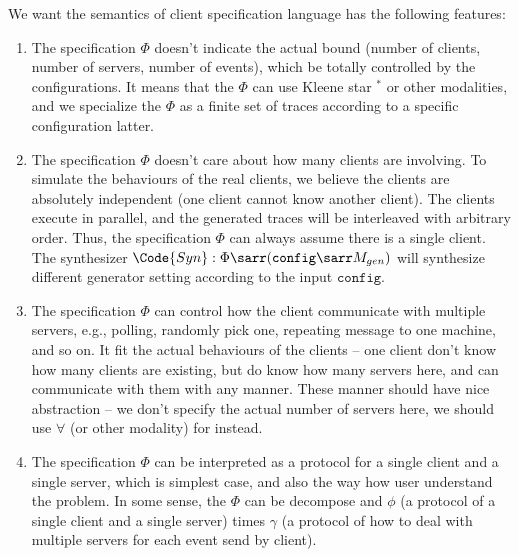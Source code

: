 We want the semantics of client specification language has the following features:
\begin{enumerate}
    \item The specification $\Phi$ doesn't indicate the actual bound (number of clients, number of servers, number of events), which be totally controlled by the configurations. It means that the $\Phi$ can use Kleene star $^*$ or other modalities, and we specialize the $\Phi$ as a finite set of traces according to a specific configuration latter.
    \item The specification $\Phi$ doesn't care about how many clients are involving. To simulate the behaviours of the real clients, we believe the clients are absolutely independent (one client cannot know another client). The clients execute in parallel, and the generated traces will be interleaved with arbitrary order. Thus, the specification $\Phi$ can always assume there is a single client. The synthesizer $\Code{Syn}:\Phi \sarr (\mathtt{config} \sarr  M_{gen})$ will synthesize different generator setting according to the input $\mathtt{config}$. 
    \item The specification $\Phi$ can control how the client communicate with multiple servers, e.g., polling, randomly pick one, repeating message to one machine, and so on. It fit the actual behaviours of the clients -- one client don't know how many clients are existing, but do know how many servers here, and can communicate with them with any manner. These manner should have nice abstraction -- we don't specify the actual number of servers here, we should use $\forall$ (or other modality) for instead.
    \item The specification $\Phi$ can be interpreted as a protocol for a single client and a single server, which is simplest case, and also the way how user understand the problem. In some sense, the $\Phi$ can be decompose and $\phi$ (a protocol of a single client and a single server) times $\gamma$ (a protocol of how to deal with multiple servers for each event send by client).
\end{enumerate}

